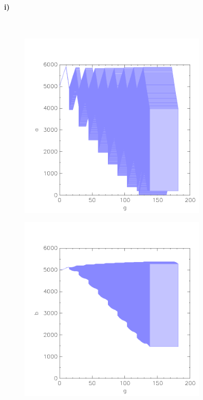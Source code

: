 \paragraph{i)}\mbox{} \\

\begin{minipage}[t]{0.5\textwidth} 
	\begin{figure}[H]
		\centering
		\includegraphics[width=0.8\textwidth]{Aufgabe_i1).png}
	\end{figure}
\end{minipage}
\hfill
\begin{minipage}[t]{0.5\textwidth} 
	\begin{figure}[H]
		\centering
		\includegraphics[width=0.8\textwidth]{Aufgabe_i2).png}
	\end{figure}
\end{minipage}

